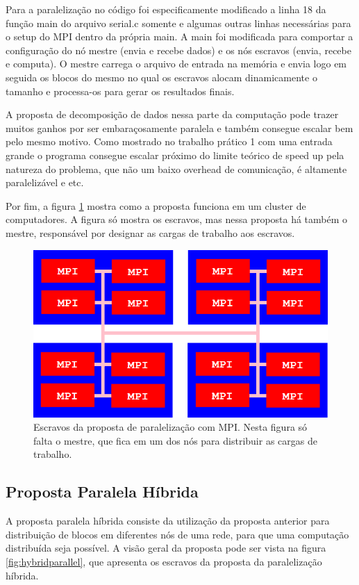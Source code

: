 \documentclass[12pt]{article}
\begin{document}
Para a paralelização no código foi especificamente modificado a linha 18 da função main do arquivo serial.c somente e algumas outras linhas necessárias para o setup do MPI dentro da própria main. A main foi modificada para comportar a configuração do nó mestre (envia e recebe dados) e os nós escravos (envia, recebe e computa). O mestre carrega o arquivo de entrada na memória e envia logo em seguida os blocos do mesmo no qual os escravos alocam dinamicamente o tamanho e processa-os para gerar os resultados finais.

A proposta de decomposição de dados nessa parte da computação pode trazer muitos ganhos por ser embaraçosamente paralela e também consegue escalar bem pelo mesmo motivo. Como mostrado no trabalho prático 1 com uma entrada grande o programa consegue escalar próximo do limite teórico de speed up pela natureza do problema, que não um baixo overhead de comunicação, é altamente paralelizável e etc.

Por fim, a figura \ref{fig:mpiparallel} mostra como a proposta funciona em um cluster de computadores. A figura só mostra os escravos, mas nessa proposta há também o mestre, responsável por designar as cargas de trabalho aos escravos.

\begin{figure}[H]
	\centering
	\includegraphics[width=0.7\linewidth]{./mpiparallel.png}
	\caption{Escravos da proposta de paralelização com MPI. Nesta figura só falta o mestre, que fica em um dos nós para distribuir as cargas de trabalho.}
	\label{fig:mpiparallel}
\end{figure}


\subsection{Proposta Paralela Híbrida}

A proposta paralela híbrida consiste da utilização da proposta anterior para distribuição de blocos em diferentes nós de uma rede, para que uma computação distribuída seja possível. A visão geral da proposta pode ser vista na figura \ref{fig:hybridparallel}, que apresenta os escravos da proposta da paralelização híbrida.
\end{document}

